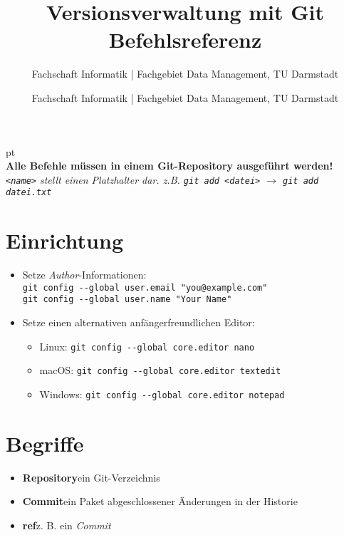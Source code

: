 \documentclass[accentcolor=tud8b,colorbacktitle,12pt]{tudexercise}
\author{Fachschaft Informatik | Fachgebiet Data Management, TU Darmstadt}
\begin{document}
\title{Versionsverwaltung mit Git\\Befehlsreferenz}
\subtitle{Fachschaft Informatik | Fachgebiet Data Management, TU Darmstadt}
\maketitle

 pt\\
\textbf{Alle Befehle müssen in einem Git-Repository ausgeführt werden!}\\
\textit{\lstinline|<name>| stellt einen Platzhalter dar. z.B. \lstinline|git add <datei>| $\rightarrow$ \lstinline|git add datei.txt|}
\section*{Einrichtung}
\begin{itemize}
	\item Setze \textit{Author}-Informationen:\\
	\lstinline|git config --global user.email "you@example.com"|\\
	\lstinline|git config --global user.name "Your Name"|

	\item Setze einen alternativen anfängerfreundlichen Editor:
	\begin{itemize}
		\item Linux: \tab\lstinline|git config --global core.editor nano|
		\item macOS: \tab\lstinline|git config --global core.editor textedit|
		\item Windows: \tab\lstinline|git config --global core.editor notepad|
	\end{itemize}
\end{itemize}

\section*{Begriffe}
\begin{itemize}
	\item \textbf{Repository}\tab ein Git-Verzeichnis
	\item \textbf{Commit}\tab ein Paket abgeschlossener Änderungen in der Historie
	\item \textbf{ref}\tab z. B. ein \textit{Commit}
\end{itemize}
\end{document}
